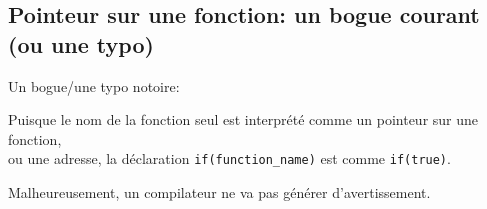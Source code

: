 \subsection{Pointeur sur une fonction: un bogue courant (ou une typo)}

Un bogue/une typo notoire:



Puisque le nom de la fonction seul est interprété comme un pointeur sur une fonction,\\
ou une adresse, la déclaration \verb|if(function_name)| est comme \verb|if(true)|.

Malheureusement, un compilateur \CCpp ne va pas générer d'avertissement.

